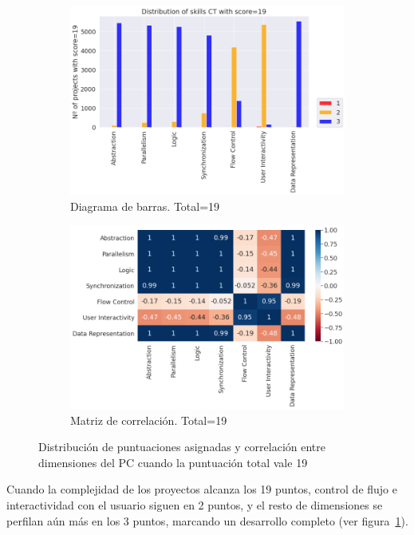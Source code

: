 \documentclass[a4paper, 12pt]{book}
\begin{document}
\begin{figure}[H]
    \centering
    \begin{subfigure}[h]{.49\textwidth} 
        \includegraphics[width=\textwidth]{img/distribucion_19_Scratch}
        \caption{Diagrama de barras. Total=19}
        \label{fig:total19}
    \end{subfigure}       
    \begin{subfigure}[h]{.49\textwidth} 
        \includegraphics[width=\textwidth]{img/corr_19_Scratch}
        \caption{Matriz de correlación. Total=19}
        \label{fig:corr19}
    \end{subfigure}
     \caption{Distribución de puntuaciones asignadas y correlación entre dimensiones del PC cuando la puntuación total vale 19}
\end{figure}

Cuando la complejidad de los proyectos alcanza los 19 puntos, control de flujo e interactividad con el usuario siguen en 2 puntos, y el resto de dimensiones se perfilan aún más en los 3 puntos, marcando un desarrollo completo (ver figura~\ref{fig:total19}).
\end{document}
